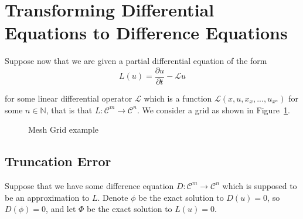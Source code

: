 \documentclass[../main.tex]{subfiles}
\begin{document}
  \section{Transforming Differential Equations to Difference Equations}
  Suppose now that we are given a partial differential equation of the form\\

  \begin{equation}
    L(u) = \frac{\partial u}{\partial t} - \mathcal{L}u
  \end{equation}

  for some linear differential operator $\mathcal{L}$ which is a function $\mathcal{L}(x, u, x_x, ..., u_{x^n})$ for some $n \in \mathbb{N}$, that is that $L :  \mathcal{C}^m \to \mathcal{C}^n$. We consider a grid as shown in Figure~\ref{fde:fig:mesh}.

  \begin{figure}[b]
    \centering
    \caption{Mesh Grid example}\label{fde:fig:mesh}
  \end{figure}

  \subsection{Truncation Error}\label{sec:fdes:truncation}
  Suppose that we have some difference equation $D : \mathcal{C}^m \to \mathcal{C}^n$ which is supposed to be an approximation to $L$. Denote $\phi$ be the exact solution to $D(u) = 0$, so $D(\phi) = 0$, and let $\Phi$ be the exact solution to $L(u) = 0$.
\end{document}
